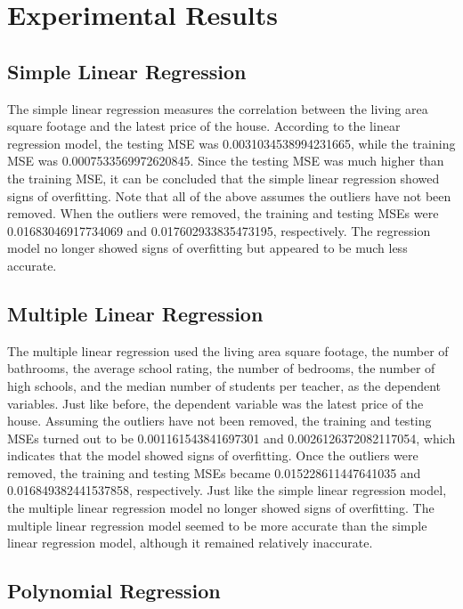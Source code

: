 \documentclass[12pt]{article}
\begin{document}
	\section{Experimental Results}
	
	\subsection{Simple Linear Regression}
	
	The simple linear regression measures the correlation between the living area square footage and the latest price of the house. According to the linear regression model, the testing MSE was 0.0031034538994231665, while the training MSE was 0.0007533569972620845. Since the testing MSE was much higher than the training MSE, it can be concluded that the simple linear regression showed signs of overfitting. Note that all of the above assumes the outliers have not been removed. When the outliers were removed, the training and testing MSEs were 0.01683046917734069 and 0.017602933835473195, respectively. The regression model no longer showed signs of overfitting but appeared to be much less accurate.
	
	
	\subsection{Multiple Linear Regression}
	
	The multiple linear regression used the living area square footage, the number of bathrooms, the average school rating, the number of bedrooms, the number of high schools, and the median number of students per teacher, as the dependent variables. Just like before, the dependent variable was the latest price of the house. Assuming the outliers have not been removed, the training and testing MSEs turned out to be 0.001161543841697301 and 0.0026126372082117054, which indicates that the model showed signs of overfitting. Once the outliers were removed, the training and testing MSEs became 0.015228611447641035 and 0.016849382441537858, respectively. Just like the simple linear regression model, the multiple linear regression model no longer showed signs of overfitting. The multiple linear regression model seemed to be more accurate than the simple linear regression model, although it remained relatively inaccurate.
	
	\subsection{Polynomial Regression}
	
\end{document}
